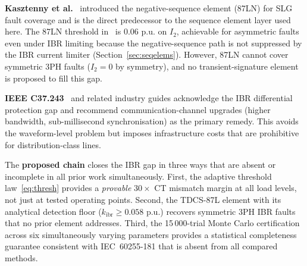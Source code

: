 \documentclass[journal,twoside,10pt]{IEEEtran}
\newcommand{\kibr}{k_{\mathrm{ibr}}}
\newcommand{\pu}{\,\text{p.u.}}
\begin{document}
\textbf{Kasztenny et al.}~\cite{Kasztenny2010} introduced the
negative-sequence element (87LN) for SLG fault coverage and is the
direct predecessor to the sequence element layer used here.
The 87LN threshold in~\cite{Kasztenny2010} is $0.06\,\pu$ on
$I_2$, achievable for asymmetric faults even under IBR limiting because
the negative-sequence path is not suppressed by the IBR current limiter
(Section~\ref{sec:seqelems}).  However, 87LN cannot cover symmetric 3PH
faults ($I_2 = 0$ by symmetry), and no transient-signature element is
proposed to fill this gap.

\textbf{IEEE C37.243}~\cite{IEEE_C37_243} and related industry guides
acknowledge the IBR differential protection gap and recommend
communication-channel upgrades (higher bandwidth, sub-millisecond
synchronisation) as the primary remedy.  This avoids the waveform-level
problem but imposes infrastructure costs that are prohibitive for
distribution-class lines.

The \textbf{proposed chain} closes the IBR gap in three ways that are
absent or incomplete in all prior work simultaneously.  First, the
adaptive threshold law~\eqref{eq:thresh} provides a \emph{provable}
$30\times$ CT mismatch margin at all load levels, not just at
tested operating points.  Second, the TDCS-87L element with its
analytical detection floor ($\kibr \geq 0.058\,\pu$) recovers
symmetric 3PH IBR faults that no prior element addresses.  Third,
the 15\,000-trial Monte Carlo certification across six simultaneously
varying parameters provides a statistical completeness guarantee
consistent with IEC~60255-181 that is absent from all compared methods.
\end{document}
